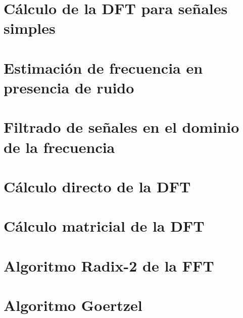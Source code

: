 \documentclass[12pt,a4paper]{article} %
\begin{document}
\tableofcontents %
\clearpage

\listoffigures %
\clearpage

\listoftables
\clearpage


\newpage
\section{Cálculo de la DFT para señales simples}


\newpage
\section{Estimación de frecuencia en presencia de ruido}


\newpage
\section{Filtrado de señales en el dominio de la frecuencia}


\newpage
\section{Cálculo directo de la DFT}


\newpage
\section{Cálculo matricial de la DFT}


\newpage
\section{Algoritmo Radix-2 de la FFT}


\newpage
\section{Algoritmo Goertzel }

\end{document}

